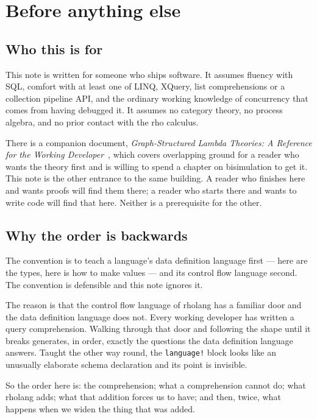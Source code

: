 \section{Before anything else}
\label{sec:preface}

\subsection{Who this is for}

This note is written for someone who ships software. It assumes fluency with
SQL, comfort with at least one of LINQ, XQuery, list comprehensions or a
collection pipeline API, and the ordinary working knowledge of concurrency that
comes from having debugged it. It assumes no category theory, no process
algebra, and no prior contact with the rho calculus.

There is a companion document, \emph{Graph-Structured Lambda Theories: A
Reference for the Working Developer}~\cite{GSLTintro}, which covers overlapping ground for a
reader who wants the theory first and is willing to spend a chapter on
bisimulation to get it. This note is the other entrance to the same building. A
reader who finishes here and wants proofs will find them there; a reader who
starts there and wants to write code will find that here. Neither is a
prerequisite for the other.

\subsection{Why the order is backwards}

The convention is to teach a language's data definition language first --- here
are the types, here is how to make values --- and its control flow language
second. The convention is defensible and this note ignores it.

The reason is that the control flow language of rholang has a familiar door and
the data definition language does not. Every working developer has written a
query comprehension. Walking through that door and following the shape until it
breaks generates, in order, exactly the questions the data definition language
answers. Taught the other way round, the \texttt{language!} block looks like an
unusually elaborate schema declaration and its point is invisible.

So the order here is: the comprehension; what a comprehension cannot do; what
rholang adds; what that addition forces us to have; and then, twice, what
happens when we widen the thing that was added.

